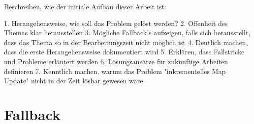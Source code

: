 Beschreiben, wie der initiale Aufbau dieser Arbeit ist:

1. Herangehensweise, wie soll das Problem gelöst werden?
2. Offenheit des Themas klar herausstellen
3. Mögliche Fallback's aufzeigen, falls sich herausstellt, dass das Thema so in der Bearbeitungszeit nicht möglich ist
4. Deutlich machen, dass die erste Herangehensweise dokumentiert wird
5. Erklären, dass Fallstricke und Probleme erläutert werden
6. Lösungsansätze für zukünftige Arbeiten definieren
7. Kenntlich machen, warum das Problem "inkrementelles Map Update" nicht in der Zeit lösbar gewesen wäre

\section{Fallback}


